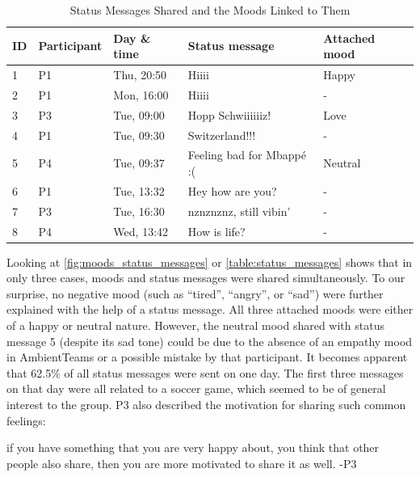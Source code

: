 \begin{table}[h] \footnotesize
    \centering
    \begin{tabularx}{.8\textwidth}{l l l l l}
        \toprule
        ID & Participant & Day \& time & Status message            & Attached mood \\
        \midrule
        1  & P1          & Thu, 20:50  & Hiiii                     & Happy         \\
        2  & P1          & Mon, 16:00  & Hiiii                     & -             \\
        3  & P3          & Tue, 09:00  & Hopp Schwiiiiiiz!         & Love          \\
        4  & P1          & Tue, 09:30  & Switzerland!!!            & -             \\
        5  & P4          & Tue, 09:37  & Feeling bad for Mbappé :( & Neutral       \\
        6  & P1          & Tue, 13:32  & Hey how are you?          & -             \\
        7  & P3          & Tue, 16:30  & nznznznz, still vibin'    & -             \\
        8  & P4          & Wed, 13:42  & How is life?              & -             \\
        \bottomrule
    \end{tabularx}
    \caption{Status Messages Shared and the Moods Linked to Them}
    \label{table:status_messages}
\end{table}

Looking at \autoref{fig:moods_status_messages} or \autoref{table:status_messages} shows that in only three cases, moods and status messages were shared simultaneously. To our surprise, no negative mood (such as \enquote{tired}, \enquote{angry}, or \enquote{sad}) were further explained with the help of a status message. All three attached moods were either of a happy or neutral nature. However, the neutral mood shared with status message 5 (despite its sad tone) could be due to the absence of an empathy mood in AmbientTeams or a possible mistake by that participant. It becomes apparent that 62.5\% of all status messages were sent on one day. The first three messages on that day were all related to a soccer game, which seemed to be of general interest to the group. P3 also described the motivation for sharing such common feelings:

\begin{displayquote}[][]
    [...] if you have something that you are very happy about, you think that other people also share, then you are more motivated to share it as well. -P3
\end{displayquote}

